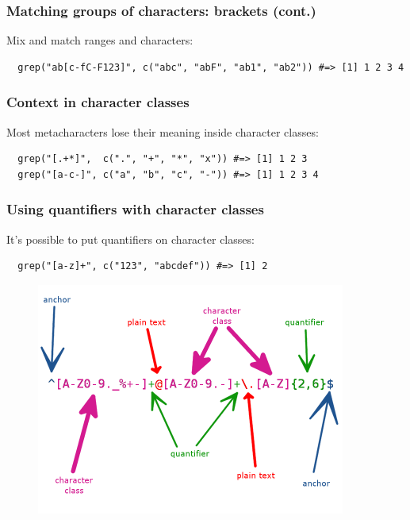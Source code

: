 \documentclass{beamer}
\begin{document}
\begin{frame}[fragile]
  \frametitle{Matching groups of characters: brackets (cont.)}
  Mix and match ranges and characters:
  \vspace{3mm}

\begin{verbatim}
  grep("ab[c-fC-F123]", c("abc", "abF", "ab1", "ab2")) #=> [1] 1 2 3 4
\end{verbatim}
\end{frame}
\begin{frame}[fragile]
  \frametitle{Context in character classes}
  Most metacharacters lose their meaning inside character classes:
  \vspace{3mm}

\begin{verbatim}
  grep("[.+*]",  c(".", "+", "*", "x")) #=> [1] 1 2 3
  grep("[a-c-]", c("a", "b", "c", "-")) #=> [1] 1 2 3 4
\end{verbatim}
\end{frame}
\begin{frame}[fragile]
  \frametitle{Using quantifiers with character classes}
  It's possible to put quantifiers on character classes:
  \vspace{3mm}

\begin{verbatim}
  grep("[a-z]+", c("123", "abcdef")) #=> [1] 2
\end{verbatim}
\end{frame}
\begin{frame}
  \begin{figure}[h]
    \centering
    \includegraphics[width=4in]{"email-regexp"}
  \end{figure}
\end{frame}
\end{document}
